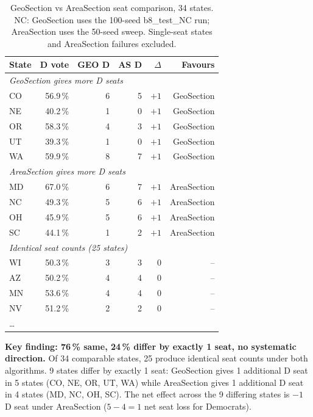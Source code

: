 \begin{table}[h]
\centering
\caption{GeoSection vs AreaSection seat comparison, 34 states.
NC: GeoSection uses the 100-seed b8\_test\_NC run; AreaSection uses the 50-seed sweep.
Single-seat states and AreaSection failures excluded.}
\label{tab:head-to-head}
\begin{tabular}{lrrrrr}
\toprule
State & D vote & GEO D & AS D & $\Delta$ & Favours \\
\midrule
\multicolumn{6}{l}{\textit{GeoSection gives more D seats}} \\
CO  & 56.9\,\% & 6 & 5 & $+1$ & GeoSection \\
NE  & 40.2\,\% & 1 & 0 & $+1$ & GeoSection \\
OR  & 58.3\,\% & 4 & 3 & $+1$ & GeoSection \\
UT  & 39.3\,\% & 1 & 0 & $+1$ & GeoSection \\
WA  & 59.9\,\% & 8 & 7 & $+1$ & GeoSection \\
\midrule
\multicolumn{6}{l}{\textit{AreaSection gives more D seats}} \\
MD  & 67.0\,\% & 6 & 7 & $+1$ & AreaSection \\
NC  & 49.3\,\% & 5 & 6 & $+1$ & AreaSection \\
OH  & 45.9\,\% & 5 & 6 & $+1$ & AreaSection \\
SC  & 44.1\,\% & 1 & 2 & $+1$ & AreaSection \\
\midrule
\multicolumn{6}{l}{\textit{Identical seat counts (25 states)}} \\
WI  & 50.3\,\% & 3 & 3 & 0 & -- \\
AZ  & 50.2\,\% & 4 & 4 & 0 & -- \\
MN  & 53.6\,\% & 4 & 4 & 0 & -- \\
NV  & 51.2\,\% & 2 & 2 & 0 & -- \\
\ldots & & & & & \\
\bottomrule
\end{tabular}
\end{table}

\noindent\textbf{Key finding: 76\,\% same, 24\,\% differ by exactly 1 seat, no
systematic direction.}
Of 34 comparable states, 25 produce identical seat counts under both algorithms.
9 states differ by exactly 1 seat: GeoSection gives 1 additional D seat in 5 states
(CO, NE, OR, UT, WA) while AreaSection gives 1 additional D seat in 4 states
(MD, NC, OH, SC).
The net effect across the 9 differing states is $-1$ D seat under AreaSection
($5 - 4 = 1$ net seat loss for Democrats).


